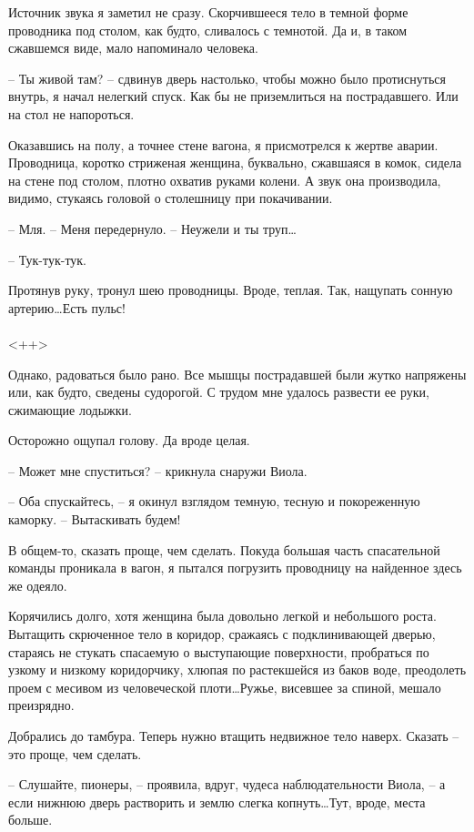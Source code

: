 \documentclass[a4paper]{book}
\begin{document}
Источник звука я заметил не сразу. Скорчившееся  тело в темной форме проводника под столом, как будто, сливалось с темнотой. Да и, в таком сжавшемся виде, мало напоминало человека. 

-- Ты живой там? -- сдвинув дверь настолько, чтобы можно было протиснуться внутрь, я начал нелегкий спуск. Как бы не приземлиться на пострадавшего. Или на стол не напороться.

Оказавшись на полу, а точнее стене вагона, я присмотрелся к жертве аварии. Проводница, коротко стриженая женщина, буквально, сжавшаяся в комок, сидела на стене под столом, плотно охватив руками колени. А звук она производила, видимо, стукаясь головой о столешницу при покачивании.

-- Мля. -- Меня передернуло. -- Неужели и ты труп\ldots

-- Тук-тук-тук.

Протянув руку, тронул шею проводницы. Вроде, теплая. Так, нащупать сонную артерию\ldots Есть пульс!

\paragraph{}<++>

Однако, радоваться было рано. Все мышцы пострадавшей были жутко напряжены или, как будто, сведены судорогой. С трудом мне удалось развести ее руки, сжимающие лодыжки. 

Осторожно ощупал голову. Да вроде целая. 

-- Может мне спуститься? -- крикнула снаружи Виола.

-- Оба спускайтесь, -- я окинул взглядом темную, тесную и покореженную каморку. -- Вытаскивать будем! 

В общем-то, сказать проще, чем сделать. Покуда большая часть спасательной команды проникала в вагон, я пытался погрузить проводницу на найденное здесь же одеяло. 

Корячились долго, хотя женщина была довольно легкой и небольшого роста. Вытащить скрюченное тело в коридор, сражаясь с подклинивающей дверью, стараясь не стукать спасаемую о выступающие поверхности, пробраться по узкому и низкому коридорчику, хлюпая по растекшейся из баков воде, преодолеть проем с месивом из человеческой плоти\ldots Ружье, висевшее за спиной, мешало преизрядно. 

Добрались до тамбура. Теперь нужно втащить недвижное тело наверх. Сказать -- это проще, чем сделать. 

-- Слушайте, пионеры, -- проявила, вдруг, чудеса наблюдательности Виола, -- а если нижнюю дверь растворить и землю слегка копнуть\ldots Тут, вроде, места больше.
\end{document}
